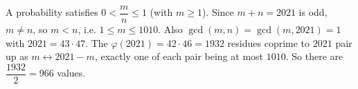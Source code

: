 A probability satisfies $0<\dfrac mn\le1$ (with $m\ge1$). Since $m+n=2021$ is odd, $m\ne n$, so $m<n$, i.e. $1\le m\le1010$. Also $\gcd(m,n)=\gcd(m,2021)=1$ with $2021=43\cdot47$. The $\varphi(2021)=42\cdot46=1932$ residues coprime to $2021$ pair up as $m\leftrightarrow2021-m$, exactly one of each pair being at most $1010$. So there are $\dfrac{1932}2=\boxed{966}$ values.
